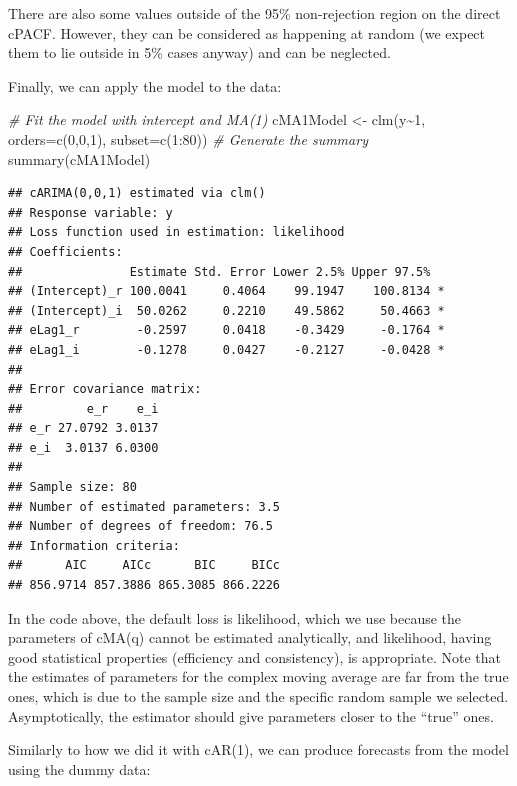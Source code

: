 \documentclass[
]{book}
\newenvironment{Shaded}{\begin{snugshade}}{\end{snugshade}}
\newcommand{\AttributeTok}[1]{\textcolor[rgb]{0.77,0.63,0.00}{#1}}
\newcommand{\CommentTok}[1]{\textcolor[rgb]{0.56,0.35,0.01}{\textit{#1}}}
\newcommand{\DecValTok}[1]{\textcolor[rgb]{0.00,0.00,0.81}{#1}}
\newcommand{\FunctionTok}[1]{\textcolor[rgb]{0.00,0.00,0.00}{#1}}
\newcommand{\NormalTok}[1]{#1}
\newcommand{\OtherTok}[1]{\textcolor[rgb]{0.56,0.35,0.01}{#1}}
\newcommand{\SpecialCharTok}[1]{\textcolor[rgb]{0.00,0.00,0.00}{#1}}
\begin{document}
There are also some values outside of the 95\% non-rejection region on the direct cPACF. However, they can be considered as happening at random (we expect them to lie outside in 5\% cases anyway) and can be neglected.

Finally, we can apply the model to the data:

\begin{Shaded}
\begin{Highlighting}[]
\CommentTok{\# Fit the model with intercept and MA(1)}
\NormalTok{cMA1Model }\OtherTok{\textless{}{-}} \FunctionTok{clm}\NormalTok{(y}\SpecialCharTok{\textasciitilde{}}\DecValTok{1}\NormalTok{, }\AttributeTok{orders=}\FunctionTok{c}\NormalTok{(}\DecValTok{0}\NormalTok{,}\DecValTok{0}\NormalTok{,}\DecValTok{1}\NormalTok{),}
                 \AttributeTok{subset=}\FunctionTok{c}\NormalTok{(}\DecValTok{1}\SpecialCharTok{:}\DecValTok{80}\NormalTok{))}
\CommentTok{\# Generate the summary}
\FunctionTok{summary}\NormalTok{(cMA1Model)}
\end{Highlighting}
\end{Shaded}

\begin{verbatim}
## cARIMA(0,0,1) estimated via clm()
## Response variable: y
## Loss function used in estimation: likelihood
## Coefficients:
##               Estimate Std. Error Lower 2.5% Upper 97.5%  
## (Intercept)_r 100.0041     0.4064    99.1947    100.8134 *
## (Intercept)_i  50.0262     0.2210    49.5862     50.4663 *
## eLag1_r        -0.2597     0.0418    -0.3429     -0.1764 *
## eLag1_i        -0.1278     0.0427    -0.2127     -0.0428 *
## 
## Error covariance matrix:
##         e_r    e_i
## e_r 27.0792 3.0137
## e_i  3.0137 6.0300
## 
## Sample size: 80
## Number of estimated parameters: 3.5
## Number of degrees of freedom: 76.5
## Information criteria:
##      AIC     AICc      BIC     BICc 
## 856.9714 857.3886 865.3085 866.2226
\end{verbatim}

In the code above, the default loss is likelihood, which we use because the parameters of cMA(q) cannot be estimated analytically, and likelihood, having good statistical properties (efficiency and consistency), is appropriate. Note that the estimates of parameters for the complex moving average are far from the true ones, which is due to the sample size and the specific random sample we selected. Asymptotically, the estimator should give parameters closer to the ``true'' ones.

Similarly to how we did it with cAR(1), we can produce forecasts from the model using the dummy data:
\end{document}
